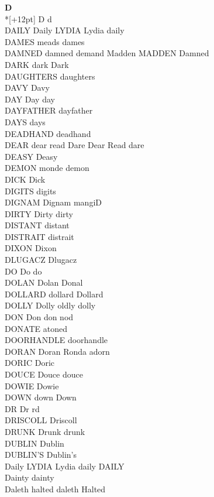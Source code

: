\vspace{14pt}
\noindent\textbf{\Large D}\\*[+12pt]
D d\\
DAILY Daily LYDIA Lydia daily\\
DAMES meads dames\\
DAMNED damned demand Madden MADDEN Damned\\
DARK dark Dark\\
DAUGHTERS daughters\\
DAVY Davy\\
DAY Day day\\
DAYFATHER dayfather\\
DAYS days\\
DEADHAND deadhand\\
DEAR dear read Dare Dear Read dare\\
DEASY Deasy\\
DEMON monde demon\\
DICK Dick\\
DIGITS digits\\
DIGNAM Dignam mangiD\\
DIRTY Dirty dirty\\
DISTANT distant\\
DISTRAIT distrait\\
DIXON Dixon\\
DLUGACZ Dlugacz\\
DO Do do\\
DOLAN Dolan Donal\\
DOLLARD dollard Dollard\\
DOLLY Dolly oldly dolly\\
DON Don don nod\\
DONATE atoned\\
DOORHANDLE doorhandle\\
DORAN Doran Ronda adorn\\
DORIC Doric\\
DOUCE Douce douce\\
DOWIE Dowie\\
DOWN down Down\\
DR Dr rd\\
DRISCOLL Driscoll\\
DRUNK Drunk drunk\\
DUBLIN Dublin\\
DUBLIN'S Dublin's\\
Daily LYDIA Lydia daily DAILY\\
Dainty dainty\\
Daleth halted daleth Halted\\

